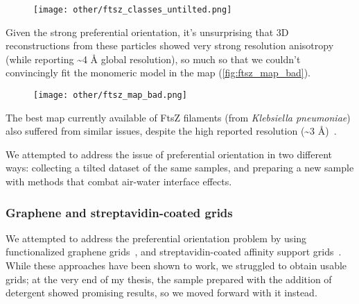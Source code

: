 \begin{figure}[ht]
    \centering
    \texttt{[image: other/ftsz\_classes\_untilted.png]}
    \label{fig:ftsz_classes}
\end{figure}

Given the strong preferential orientation, it's unsurprising that 3D reconstructions from these particles showed very strong resolution anisotropy (while reporting \sim4 Å global resolution), so much so that we couldn't convincingly fit the monomeric model in the map (\autoref{fig:ftsz_map_bad}).

\begin{figure}[ht]
    \centering
    \texttt{[image: other/ftsz\_map\_bad.png]}
    \label{fig:ftsz_map_bad}
\end{figure}

The best map currently available of FtsZ filaments (from \textit{Klebsiella pneumoniae}) also suffered from similar issues, despite the high reported resolution (\sim3 Å)~\cite{fujitaStructuresFtsZSingle2023}.

We attempted to address the issue of preferential orientation in two different ways: collecting a tilted dataset of the same samples, and preparing a new sample with methods that combat air-water interface effects.

\subsubsection{Graphene and streptavidin-coated grids}

We attempted to address the preferential orientation problem by using functionalized graphene grids~\cite{luFunctionalizedGrapheneGrids2022}, and streptavidin-coated affinity support grids~\cite{crucifixImmobilizationBiotinylatedDNA2004,hanLongShelflifeStreptavidin2016}.
While these approaches have been shown to work, we struggled to obtain usable grids; at the very end of my thesis, the sample prepared with the addition of detergent showed promising results, so we moved forward with it instead.

